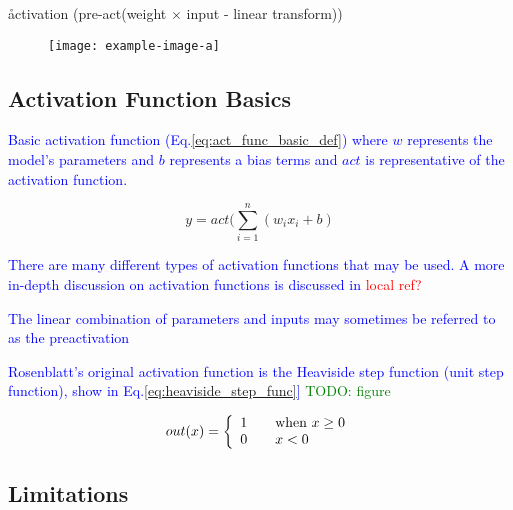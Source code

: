 \r{activation (pre-act(weight $\times$ input - linear transform))}


\begin{figure}[htp]
	\centering
	\texttt{[image: example-image-a]}\hfil
	\caption{}
	\label{fig:ann_decision_space}
\end{figure}

\subsection{Activation Function Basics}

\textcolor{blue}{Basic activation function (Eq.\ref{eq:act_func_basic_def}) where $w$ represents the model's parameters and $b$ represents a bias terms and $act$ is representative of the activation function.}

\begin{equation}
{y = act (\sum_{i=1}^{n}(w_i x_i + b)}
\label{eq:act_func_basic_def}
\end{equation}

\textcolor{blue}{There are many different types of activation functions that may be used. A more in-depth discussion on activation functions is discussed in \textcolor{red}{local ref?}}

\textcolor{blue}{The linear combination of parameters and inputs may sometimes be referred to as the preactivation}

\textcolor{blue}{Rosenblatt's original activation function is the {Heaviside step function} ({unit step function}), show in Eq.\ref{eq:heaviside_step_func}] \textcolor{green}{TODO: figure}}

\begin{equation}
{out(x) = \left\{
	\begin{array}{ll}
	1 & \quad $when $ x \geq 0 \\
	0 & \quad x < 0
	\end{array}
	\right.}
\label{eq:heaviside_step_func}
\end{equation}



\subsection{Limitations}

